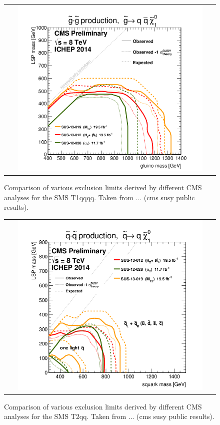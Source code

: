 \begin{figure}[!tp]
  \centering
  \begin{tabular}{c}
    \includegraphics[width=0.9\textwidth]{figures/T1_ICHEP2014_All.png}
  \end{tabular}
  \caption{Comparison of various exclusion limits derived by different CMS analyses for the SMS T1qqqq. Taken from ... (cms susy public results).}
  \label{fig:T1_comp}
\end{figure}

\begin{figure}[!tp]
  \centering
  \begin{tabular}{c}
    \includegraphics[width=0.9\textwidth]{figures/T2_ICHEP2014.png}
  \end{tabular}
  \caption{Comparison of various exclusion limits derived by different CMS analyses for the SMS T2qq. Taken from ... (cms susy public results).}
  \label{fig:T1_comp}
\end{figure}

